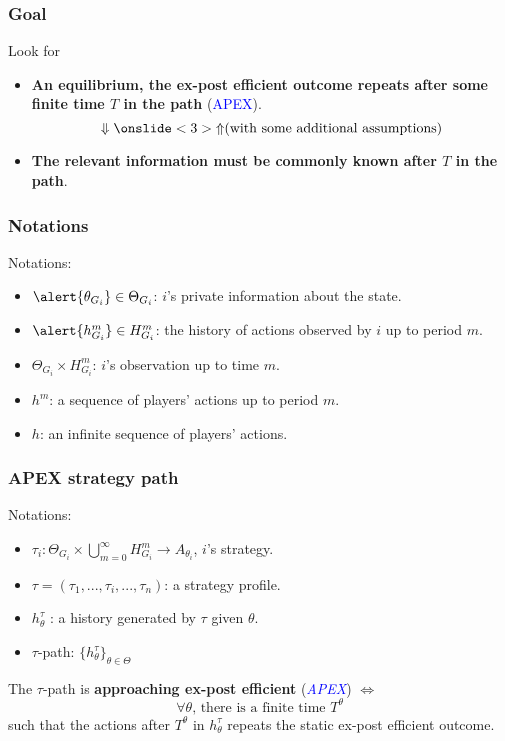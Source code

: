 \documentclass[9pt]{beamer}
\begin{document}
\begin{frame}
  \frametitle{Goal}

Look for
\begin{itemize}
\item \textbf{An equilibrium, the ex-post efficient outcome repeats after some \alert{finite time $T$} in the path} (\textcolor{blue}{APEX}). \pause
\[\Downarrow\onslide<3>{{\Uparrow}(\text{with some additional assumptions})}\]
\item \textbf{The relevant information must be \alert{commonly known after $T$} in the path}.  
\end{itemize}

\end{frame}







\begin{frame}
  \frametitle{Notations}

Notations:
\begin{itemize}

\item $\alert{\theta_{G_i}}\in \Theta_{G_i}$: $i$'s private information about the state. 
\item $\alert{h^{m}_{G_i}}\in H^m_{G_i}$: the history of actions observed by $i$ up to period $m$.
\item \alert{$\Theta_{G_i}\times H^m_{G_i}$}: $i$'s observation up to time $m$.
\pause
\item $h^m$: a sequence of players' actions up to period $m$.
\item $h$: an infinite sequence of players' actions. 




 
\end{itemize}

\end{frame}




\begin{frame}
  \frametitle{APEX strategy path}
Notations:
\begin{itemize}
\item $\tau_i:\Theta_{G_i}\times \bigcup^{\infty}_{m=0} H^{m}_{G_i} \rightarrow A_{\theta_i}$, $i$'s strategy.
\item $\tau=(\tau_1,...,\tau_i,...,\tau_n)$: a strategy profile. 
\item $h^{\tau}_{\theta}$ : a history generated by $\tau$ given $\theta$.
\item $\tau$-path: $\{h^{\tau}_{\theta}\}_{\theta\in \Theta}$
\end{itemize}

\begin{definition}
The $\tau$-path is \textbf{approaching ex-post efficient} (\textcolor{blue}{\textit{APEX}}) $\Leftrightarrow$ 
\[\text{$\forall\theta$,  there is a finite time $T^{\theta}$}\] 
such that the actions after $T^{\theta}$ in $h^{\tau}_{\theta}$ repeats the static ex-post efficient outcome.
\end{definition}


\end{frame}
\end{document}
